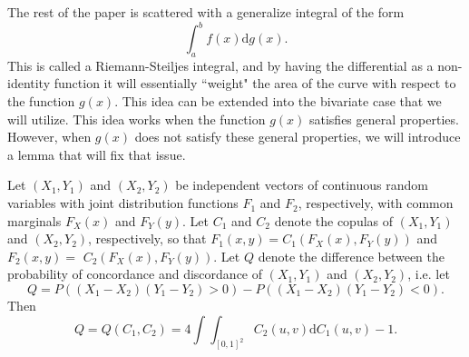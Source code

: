 The rest of the paper is scattered with a generalize integral of the form $$\int_a^bf\left(x\right)\mathrm{d}g\left(x\right).$$ This is called a Riemann-Steiljes integral, and by having the differential as a non-identity function it will essentially ``weight" the area of the curve with respect to the function $g\left(x\right)$. This idea can be extended into the bivariate case that we will utilize. This idea works when the function $g\left(x\right)$ satisfies general properties. However, when $g\left(x\right)$ does not satisfy these general properties, we will introduce a lemma that will fix that issue.
\begin{theorem}\label{theorem:Q}
     Let $\left(X_1,Y_1\right)$ and $\left(X_2,Y_2\right)$ be independent vectors of continuous random variables with joint distribution functions $F_1$ and $F_2$, respectively, with common marginals $F_X\left(x\right)$ and $F_Y\left(y\right)$. Let $C_1$ and $C_2$ denote the copulas of $\left(X_1,Y_1\right)$ and $\left(X_2,Y_2\right)$, respectively, so that $F_1\left(x,y\right)=C_1\left(F_X\left(x\right),F_Y\left(y\right)\right)$ and $F_2\left(x,y\right)=$ $C_2\left(F_X\left(x\right),F_Y\left(y\right)\right)$. Let $Q$ denote the difference between the probability of concordance and discordance of $\left(X_1,Y_1\right)$ and $\left(X_2,Y_2\right)$, i.e. let $$Q=P\left(\left(X_1-X_2\right)\left(Y_1-Y_2\right)>0\right)-P\left(\left(X_1-X_2\right)\left(Y_1-Y_2\right)<0\right).$$ Then $$Q=Q\left(C_1,C_2\right)=4\int\int_{[0,1]^2}C_2\left(u,v\right)\mathrm{d}C_1\left(u,v\right)-1.$$
\end{theorem}
